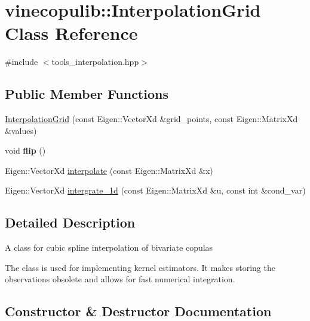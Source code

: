 \hypertarget{classvinecopulib_1_1_interpolation_grid}{}\section{vinecopulib\+:\+:Interpolation\+Grid Class Reference}
\label{classvinecopulib_1_1_interpolation_grid}


{\ttfamily \#include $<$tools\+\_\+interpolation.\+hpp$>$}

\subsection*{Public Member Functions}
\begin{DoxyCompactItemize}
\item 
\hyperlink{classvinecopulib_1_1_interpolation_grid_a9e63e4af3a252454eeae6df38fd8e0ca}{Interpolation\+Grid} (const Eigen\+::\+Vector\+Xd \&grid\+\_\+points, const Eigen\+::\+Matrix\+Xd \&values)
\item 
void {\bfseries flip} ()\hypertarget{classvinecopulib_1_1_interpolation_grid_a8dc18717a2e8dfe5b157571805a25dab}{}\label{classvinecopulib_1_1_interpolation_grid_a8dc18717a2e8dfe5b157571805a25dab}

\item 
Eigen\+::\+Vector\+Xd \hyperlink{classvinecopulib_1_1_interpolation_grid_a7fe207d7f864d2b05654c5efb5e27f35}{interpolate} (const Eigen\+::\+Matrix\+Xd \&x)
\item 
Eigen\+::\+Vector\+Xd \hyperlink{classvinecopulib_1_1_interpolation_grid_aa1811201ba71d8c3375b8e42df6f673a}{intergrate\+\_\+1d} (const Eigen\+::\+Matrix\+Xd \&u, const int \&cond\+\_\+var)
\end{DoxyCompactItemize}


\subsection{Detailed Description}
A class for cubic spline interpolation of bivariate copulas

The class is used for implementing kernel estimators. It makes storing the observations obsolete and allows for fast numerical integration. 

\subsection{Constructor \& Destructor Documentation}
